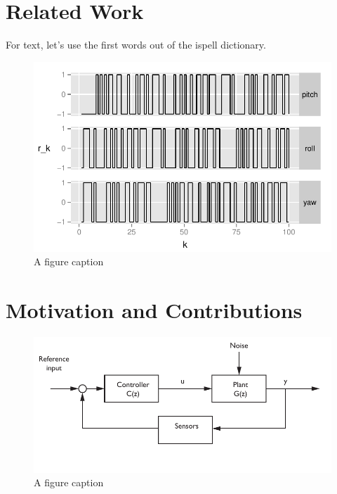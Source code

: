 \section{Related Work}

For text, let's use the first words out of the ispell dictionary.

\begin{figure}[htb!]
	\centering
	\includegraphics{../fig/prbs_input.pdf}
	\caption{A figure caption}
\end{figure}


\section{Motivation and Contributions}

\begin{figure}[htb!]
	\centering
	\includegraphics{../fig/closed_loop_block_diagram.pdf}
	\caption{A figure caption}
\end{figure}

